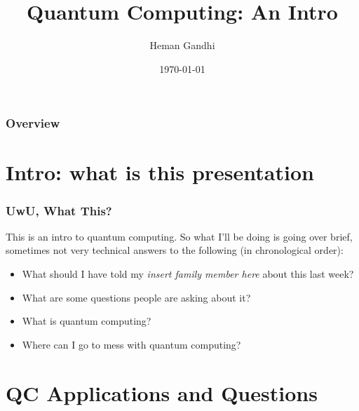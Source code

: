 \documentclass{beamer}
\title[Intro to Quantum]{Quantum Computing: An Intro} %
\author{Heman Gandhi} %
\institute[Rutgers] %
{
 Rutgers -- HackRU RnD\\ %
\medskip
\textit{hemang@ndhi.ninja} %
}
\date{\today} %
\begin{document}
\begin{frame}
\titlepage %
\end{frame}

\begin{frame}
\frametitle{Overview} %
\tableofcontents %
\end{frame}


\section{Intro: what is this presentation} %

\begin{frame}
\frametitle{UwU, What This?}
This is an intro to quantum computing.
So what I'll be doing is going over brief,
sometimes not very technical answers to the following (in chronological order):
\begin{itemize}
    \item What should I have told my \textit{insert family member here} about this last week?
    \item What are some questions people are asking about it?
    \item What is quantum computing?
    \item Where can I go to mess with quantum computing?
\end{itemize}
\end{frame}

\section{QC Applications and Questions}
\end{document}
